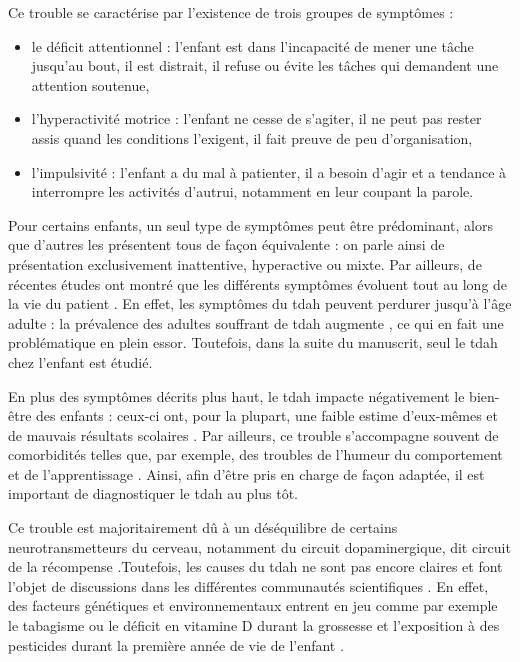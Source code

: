 Ce trouble se caractérise par l'existence de trois groupes de symptômes \citep{HAS} : 
\begin{itemize}
\item le déficit attentionnel : l'enfant est dans l'incapacité de mener une tâche jusqu'au bout, il est distrait, il refuse ou évite les tâches qui demandent
une attention soutenue,
\item l'hyperactivité motrice : l'enfant ne cesse de s'agiter, il ne peut pas rester assis quand les conditions l'exigent, il fait preuve de peu d'organisation,
\item l'impulsivité : l'enfant a du mal à patienter, il a besoin d'agir et a tendance à interrompre les activités d'autrui, notamment en leur coupant la parole.
\end{itemize}
Pour certains enfants, un seul type de symptômes peut être prédominant, alors que d'autres les présentent tous de façon équivalente \citep{DSM-5} : 
on parle ainsi de présentation exclusivement inattentive, hyperactive ou mixte. Par ailleurs, de récentes 
études ont montré que les différents symptômes évoluent tout au long de la vie du patient \citep{CFDCAP, Epstein2013}. En effet, les symptômes du \gls{tdah}
peuvent perdurer jusqu'à l'âge adulte \citep{Faraone2006} : la prévalence des adultes souffrant de \gls{tdah} augmente \citep{Chung2019, Weibel2019}, 
ce qui en fait une problématique en plein essor. Toutefois, dans la suite du manuscrit, seul le \gls{tdah} chez l'enfant est étudié. 

En plus des symptômes décrits plus haut, le \gls{tdah} impacte négativement le bien-être des enfants : ceux-ci ont, pour la plupart, une faible estime d'eux-mêmes 
\citep{Shaw2005} et de mauvais résultats scolaires \citep{Barry2002}. Par ailleurs, ce trouble s'accompagne souvent de comorbidités telles que, par exemple, 
des troubles de l'humeur du comportement et de l'apprentissage \citep{Monastra2005}. Ainsi, afin d'être pris en charge de façon adaptée, il est 
important de diagnostiquer le \gls{tdah} au plus tôt. 

Ce trouble est majoritairement dû à un déséquilibre de certains neurotransmetteurs du cerveau, notamment du circuit dopaminergique, 
dit circuit de la récompense \citep{Daley2010, Punja2016}.Toutefois, les causes du \gls{tdah} ne sont pas encore claires et font l'objet de discussions
dans les différentes communautés scientifiques \citep{Galera2014}. En effet, des facteurs génétiques et environnementaux entrent en jeu comme par exemple le tabagisme ou le déficit en
vitamine D durant la grossesse et l'exposition à des pesticides durant la première année de vie de l'enfant \citep{Galera2014, Sucksdorff2019}.

